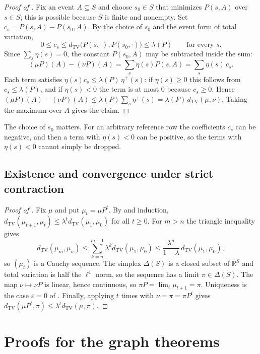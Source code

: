 \documentclass[11pt]{article}
\theoremstyle{definition}
\newcommand{\1}{\mathbf{1}}
\newcommand{\thmNGObjectContractive}{\Cref{thm:NG_OBJECT_CONTRACTIVE}}
\newcommand{\dTV}{d_{\mathrm{TV}}}
\begin{document}
\begin{proof}[Proof of ]
Fix an event $A\subseteq S$ and choose $s_0\in S$ that minimizes $P(s,A)$ over $s\in S$; this is possible because $S$ is finite and nonempty.
Set $c_s=P(s,A)-P(s_0,A)$.
By the choice of $s_0$ and the event form of total variation,
\[
  0\le c_s\le\dTV\bigl(P(s,\cdot),P(s_0,\cdot)\bigr)\le\lambda(P)\qquad\text{for every }s.
\]
Since $\sum_s\eta(s)=0$, the constant $P(s_0,A)$ may be subtracted inside the sum:
\[
  (\mu P)(A)-(\nu P)(A)=\sum_s\eta(s)P(s,A)=\sum_s\eta(s)\,c_s.
\]
Each term satisfies $\eta(s)c_s\le\lambda(P)\,\eta^+(s)$: if $\eta(s)\ge 0$ this follows from $c_s\le\lambda(P)$, and if $\eta(s)<0$ the term is at most $0$ because $c_s\ge 0$.
Hence $(\mu P)(A)-(\nu P)(A)\le\lambda(P)\sum_s\eta^+(s)=\lambda(P)\,\dTV(\mu,\nu)$.
Taking the maximum over $A$ gives the claim.
\end{proof}

The choice of $s_0$ matters.
For an arbitrary reference row the coefficients $c_s$ can be negative, and then a term with $\eta(s)<0$ can be positive, so the terms with $\eta(s)<0$ cannot simply be dropped.

\subsection{Existence and convergence under strict contraction}

\begin{proof}[Proof of ]
Fix $\mu$ and put $\mu_t=\mu P^t$.
By  and induction, $\dTV(\mu_{t+1},\mu_t)\le\lambda^t\dTV(\mu_1,\mu_0)$ for all $t\ge 0$.
For $m>n$ the triangle inequality gives
\[
  \dTV(\mu_m,\mu_n)\le\sum_{k=n}^{m-1}\lambda^k\dTV(\mu_1,\mu_0)\le\frac{\lambda^n}{1-\lambda}\,\dTV(\mu_1,\mu_0),
\]
so $(\mu_t)$ is a Cauchy sequence.
The simplex $\Delta(S)$ is a closed subset of $\mathbb{R}^S$ and total variation is half the $\ell^1$ norm, so the sequence has a limit $\pi\in\Delta(S)$.
The map $\nu\mapsto\nu P$ is linear, hence continuous, so $\pi P=\lim_t\mu_{t+1}=\pi$.
Uniqueness is the case $\varepsilon=0$ of \thmNGObjectContractive.
Finally, applying  $t$ times with $\nu=\pi=\pi P^t$ gives $\dTV(\mu P^t,\pi)\le\lambda^t\dTV(\mu,\pi)$.
\end{proof}
 \section{Proofs for the graph theorems}\label{app:graphexact}
\end{document}
